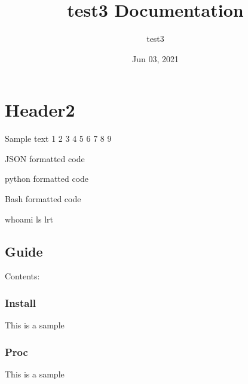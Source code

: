 \documentclass[letterpaper,10pt,english]{sphinxmanual}
\title{test3 Documentation}
\date{Jun 03, 2021}
\author{test3}
\begin{document}
\pagestyle{empty}
\sphinxmaketitle
\pagestyle{plain}
\sphinxtableofcontents
\pagestyle{normal}
\label{\detokenize{index::doc}}



\chapter{Header2}
\label{\detokenize{index:header2}}
\sphinxAtStartPar
Sample text 1 2 3 4 5 6 7 8 9

\sphinxAtStartPar
JSON formatted code

\begin{sphinxVerbatim}[commandchars=\\\{\}]
   
\end{sphinxVerbatim}

\sphinxAtStartPar
python formatted code

\begin{sphinxVerbatim}[commandchars=\\\{\}]
  
\end{sphinxVerbatim}

\sphinxAtStartPar
Bash formatted code

\begin{sphinxVerbatim}[commandchars=\\\{\}]
whoami
ls \PYGZhy{}lrt
\end{sphinxVerbatim}


\section{Guide}
\label{\detokenize{index:guide}}
\sphinxAtStartPar
Contents:


\subsection{Install}
\label{\detokenize{install:install}}\label{\detokenize{install::doc}}
\sphinxAtStartPar
This is a sample


\subsection{Proc}
\label{\detokenize{procedures:proc}}\label{\detokenize{procedures::doc}}
\sphinxAtStartPar
This is a sample
\end{document}
